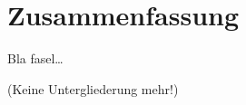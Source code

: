 
\chapter{Zusammenfassung}
\label{ch:Zusammenfassung}
Bla fasel\ldots

(Keine Untergliederung mehr!)

